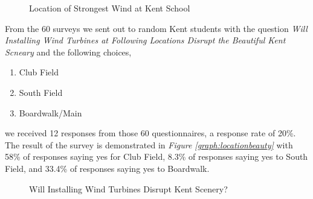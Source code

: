 \documentclass[review]{elsarticle}
\begin{document}
\begin{figure}
    \caption{Location of Strongest Wind at Kent School}
    \label{fig:locationpick}
\end{figure}

\clearpage

From the 60 surveys we sent out to random Kent students with the question \textit{Will Installing Wind Turbines at Following Locations Disrupt the Beautiful Kent Scneary} 
and the following choices,
\begin{enumerate}
    \item Club Field
    \item South Field
    \item Boardwalk/Main
\end{enumerate}

we received 12 responses from those 60 questionnaires, a response rate of 20\%. The result of the survey is demonstrated in \textit{Figure \ref{graph:locationbeauty}} with 58\% of responses saying yes 
for Club Field, 8.3\% of responses saying yes to South Field, and 33.4\% of responses saying yes to Boardwalk.\\

\begin{figure}[!h]
    \caption{Will Installing Wind Turbines Disrupt Kent Scenery?}
\end{figure}
\end{document}
